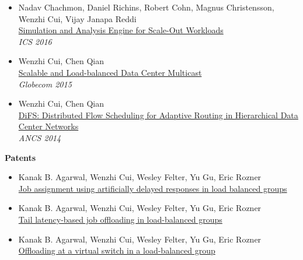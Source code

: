 \documentclass[margin, 9pt]{res} %
\begin{document}
\begin{resume}
\begin{itemize}[leftmargin=*]
	\item Nadav Chachmon, Daniel Richins, Robert Cohn, Magnus Christensson, Wenzhi Cui, Vijay Janapa Reddi\\
          \href{http://3nity.io/~vj/downloads/publications/sae16ics.pdf}{Simulation and Analysis Engine for Scale-Out Workloads}\\
          \textit{ICS 2016}

	\item Wenzhi Cui, Chen Qian\\
          \href{http://arxiv.org/pdf/1403.8065.pdf}{Scalable and Load-balanced Data Center Multicast}\\
          \textit{Globecom 2015}

	\item Wenzhi Cui, Chen Qian\\
          \href{http://www.cs.uky.edu/~qian/papers/DiFS.pdf}{DiFS: Distributed Flow Scheduling for Adaptive Routing in Hierarchical Data Center Networks}\\
          \textit{ANCS 2014}
\end{itemize}

{\large\textbf{Patents}}

\begin{itemize}[leftmargin=*] \itemsep -3pt
	\item Kanak B. Agarwal, Wenzhi Cui, Wesley Felter, Yu Gu, Eric Rozner\\
	  \href{https://patents.google.com/patent/US20180159922A1}{Job assignment using artificially delayed responses in load balanced groups}\\
	\item Kanak B. Agarwal, Wenzhi Cui, Wesley Felter, Yu Gu, Eric Rozner\\
	  \href{https://patents.google.com/patent/US20180157539A1}{Tail latency-based job offloading in load-balanced groups}\\
	\item Kanak B. Agarwal, Wenzhi Cui, Wesley Felter, Yu Gu, Eric Rozner\\
	  \href{https://patents.google.com/patent/US20180159775A1}{Offloading at a virtual switch in a load-balanced group}\\
\end{itemize}

 

\end{resume}
\end{document}
